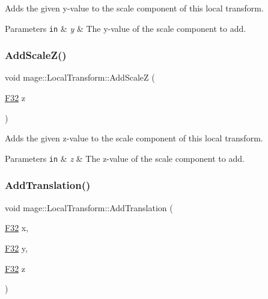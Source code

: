Adds the given y-\/value to the scale component of this local transform.


\begin{DoxyParams}[1]{Parameters}
\mbox{\tt in}  & {\em y} & The y-\/value of the scale component to add. \\
\hline
\end{DoxyParams}
\hypertarget{classmage_1_1_local_transform_a28160bebf308eec45d9649a197d91336}{}\label{classmage_1_1_local_transform_a28160bebf308eec45d9649a197d91336} 
\subsubsection{\texorpdfstring{Add\+Scale\+Z()}{AddScaleZ()}}
{\footnotesize\ttfamily void mage\+::\+Local\+Transform\+::\+Add\+ScaleZ (\begin{DoxyParamCaption}\item[{\hyperlink{namespacemage_aa97e833b45f06d60a0a9c4fc22ae02c0}{F32}}]{z }\end{DoxyParamCaption})\hspace{0.3cm}{\ttfamily [noexcept]}}

Adds the given z-\/value to the scale component of this local transform.


\begin{DoxyParams}[1]{Parameters}
\mbox{\tt in}  & {\em z} & The z-\/value of the scale component to add. \\
\hline
\end{DoxyParams}
\hypertarget{classmage_1_1_local_transform_a2796d9726a59d5a3ea90beee25008222}{}\label{classmage_1_1_local_transform_a2796d9726a59d5a3ea90beee25008222} 
\subsubsection{\texorpdfstring{Add\+Translation()}{AddTranslation()}\hspace{0.1cm}{\footnotesize\ttfamily [1/3]}}
{\footnotesize\ttfamily void mage\+::\+Local\+Transform\+::\+Add\+Translation (\begin{DoxyParamCaption}\item[{\hyperlink{namespacemage_aa97e833b45f06d60a0a9c4fc22ae02c0}{F32}}]{x,  }\item[{\hyperlink{namespacemage_aa97e833b45f06d60a0a9c4fc22ae02c0}{F32}}]{y,  }\item[{\hyperlink{namespacemage_aa97e833b45f06d60a0a9c4fc22ae02c0}{F32}}]{z }\end{DoxyParamCaption})\hspace{0.3cm}{\ttfamily [noexcept]}}

